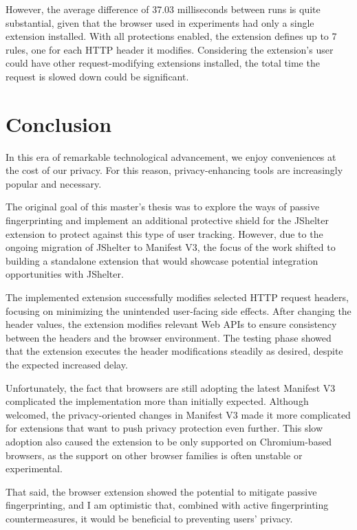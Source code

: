 However, the average difference of 37.03 milliseconds between runs is quite substantial, given that the browser used in experiments had only a single extension installed. With all protections enabled, the extension defines up to 7 rules, one for each HTTP header it modifies. Considering the extension's user could have other request-modifying extensions installed, the total time the request is slowed down could be significant.

\chapter{Conclusion}

In this era of remarkable technological advancement, we enjoy conveniences at the cost of our privacy. For this reason, privacy-enhancing tools are increasingly popular and necessary.

The original goal of this master's thesis was to explore the ways of passive fingerprinting and implement an additional protective shield for the JShelter extension to protect against this type of user tracking. However, due to the ongoing migration of JShelter to Manifest V3, the focus of the work shifted to building a standalone extension that would showcase potential integration opportunities with JShelter.

The implemented extension successfully modifies selected HTTP request headers, focusing on minimizing the unintended user-facing side effects. After changing the header values, the extension modifies relevant Web APIs to ensure consistency between the headers and the browser environment. The testing phase showed that the extension executes the header modifications steadily as desired, despite the expected increased delay.

Unfortunately, the fact that browsers are still adopting the latest Manifest V3 complicated the implementation more than initially expected. Although welcomed, the privacy-oriented changes in Manifest V3 made it more complicated for extensions that want to push privacy protection even further. This slow adoption also caused the extension to be only supported on Chromium-based browsers, as the support on other browser families is often unstable or experimental.

That said, the browser extension showed the potential to mitigate passive fingerprinting, and I am optimistic that, combined with active fingerprinting countermeasures, it would be beneficial to preventing users' privacy.

